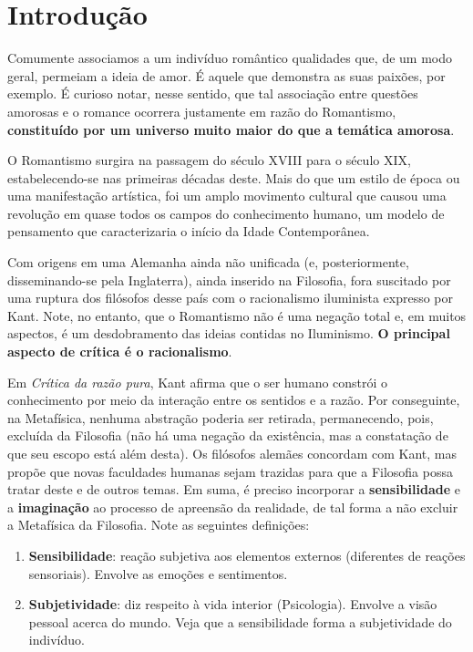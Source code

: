 \documentclass[12pt]{book}
\begin{document}
		\chapter{Introdução}
		\par Comumente associamos a um indivíduo romântico qualidades que, de um modo geral, permeiam a ideia de amor. É aquele que demonstra as suas paixões, por exemplo. É curioso notar, nesse sentido, que tal associação entre questões amorosas e o romance ocorrera justamente em razão do Romantismo, \textbf{constituído por um universo muito maior do que a temática amorosa}.
		\par O Romantismo surgira na passagem do século XVIII para o século XIX, estabelecendo-se nas primeiras décadas deste. Mais do que um estilo de época ou uma manifestação artística, foi um amplo movimento cultural que causou uma revolução em quase todos os campos do conhecimento humano, um modelo de pensamento que caracterizaria o início da Idade Contemporânea.
		\par Com origens em uma Alemanha ainda não unificada (e, posteriormente, disseminando-se pela Inglaterra), ainda inserido na Filosofia, fora suscitado por uma ruptura dos filósofos desse país com o racionalismo iluminista expresso por Kant. Note, no entanto, que o Romantismo não é uma negação total e, em muitos aspectos, é um desdobramento das ideias contidas no Iluminismo. \textbf{O principal aspecto de crítica é o racionalismo}.
		\par Em \textit{Crítica da razão pura}, Kant afirma que o ser humano constrói o conhecimento por meio da interação entre os sentidos e a razão. Por conseguinte, na Metafísica, nenhuma abstração poderia ser retirada, permanecendo, pois, excluída da Filosofia (não há uma negação da existência, mas a constatação de que seu escopo está além desta). Os filósofos alemães concordam com Kant, mas propõe que novas faculdades humanas sejam trazidas para que a Filosofia possa tratar deste e de outros temas. Em suma, é preciso incorporar a \textbf{sensibilidade} e a \textbf{imaginação} ao processo de apreensão da realidade, de tal forma a não excluir a Metafísica da Filosofia. Note as seguintes definições:
		\begin{enumerate}
			\item \textbf{Sensibilidade}: reação subjetiva aos elementos externos (diferentes de reações sensoriais). Envolve as emoções e sentimentos.
			\item \textbf{Subjetividade}: diz respeito à vida interior (Psicologia). Envolve a visão pessoal acerca do mundo. Veja que a sensibilidade forma a subjetividade do indivíduo.
		\end{enumerate}
\end{document}

